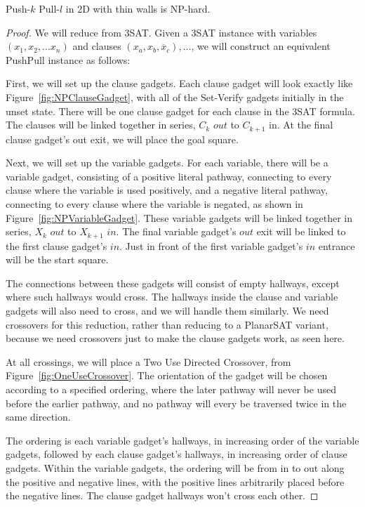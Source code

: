 \begin{theorem}
\label{thm:2DNPhard}
Push-$k$ Pull-$l$ in 2D with thin walls is NP-hard.
\end{theorem}
\begin{proof}
    We will reduce from 3SAT. Given a 3SAT instance with variables $(x_1, x_2, \ldots x_n)$ and clauses $(x_a, x_b, \overline x_c), \ldots$, we will construct an equivalent PushPull instance as follows: 

    First, we will set up the clause gadgets. Each clause gadget will look exactly like Figure~\ref{fig:NPClauseGadget}, with all of the Set-Verify gadgets initially in the unset state. There will be one clause gadget for each clause in the 3SAT formula. The clauses will be linked together in series, $C_k$ $out$ to $C_{k+1}$ in. At the final clause gadget's out exit, we will place the goal square.

    Next, we will set up the variable gadgets. For each variable, there will be a variable gadget, consisting of a positive literal pathway, connecting to every clause where the variable is used positively, and a negative literal pathway, connecting to every clause where the variable is negated, as shown in Figure~\ref{fig:NPVariableGadget}. These variable gadgets will be linked together in series, $X_k$ $out$ to $X_{k+1}$ $in$. The final variable gadget's $out$ exit will be linked to the first clause gadget's $in$. Just in front of the first variable gadget's $in$ entrance will be the start square.

    The connections between these gadgets will consist of empty hallways, except where such hallways would cross. The hallways inside the clause and variable gadgets will also need to cross, and we will handle them similarly. We need crossovers for this reduction, rather than reducing to a PlanarSAT variant, because we need crossovers just to make the clause gadgets work, as seen here.
    
    At all crossings, we will place a Two Use Directed Crossover, from Figure~\ref{fig:OneUseCrossover}. The orientation of the gadget will be chosen according to a specified ordering, where the later pathway will never be used before the earlier pathway, and no pathway will every be traversed twice in the same direction. 

    The ordering is each variable gadget's hallways, in increasing order of the variable gadgets, followed by each clause gadget's hallways, in increasing order of clause gadgets. Within the variable gadgets, the ordering will be from in to out along the positive and negative lines, with the positive lines arbitrarily placed before the negative lines. The clause gadget hallways won't cross each other.


\end{proof}
